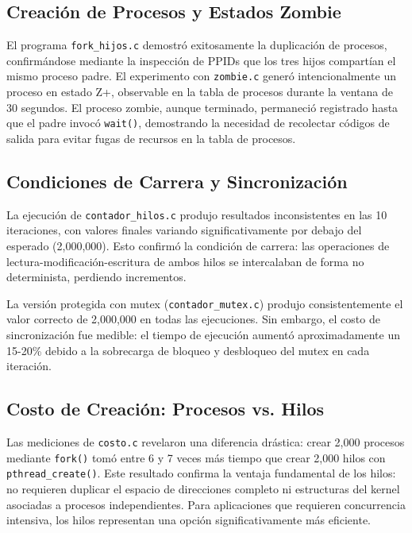 \documentclass[conference]{IEEEtran}
\begin{document}
\subsection{Creación de Procesos y Estados Zombie}

El programa \texttt{fork\_hijos.c} demostró exitosamente la duplicación de procesos, confirmándose mediante la inspección de PPIDs que los tres hijos compartían el mismo proceso padre. El experimento con \texttt{zombie.c} generó intencionalmente un proceso en estado Z+, observable en la tabla de procesos durante la ventana de 30 segundos. El proceso zombie, aunque terminado, permaneció registrado hasta que el padre invocó \texttt{wait()}, demostrando la necesidad de recolectar códigos de salida para evitar fugas de recursos en la tabla de procesos.

\subsection{Condiciones de Carrera y Sincronización}

La ejecución de \texttt{contador\_hilos.c} produjo resultados inconsistentes en las 10 iteraciones, con valores finales variando significativamente por debajo del esperado (2,000,000). Esto confirmó la condición de carrera: las operaciones de lectura-modificación-escritura de ambos hilos se intercalaban de forma no determinista, perdiendo incrementos.

La versión protegida con mutex (\texttt{contador\_mutex.c}) produjo consistentemente el valor correcto de 2,000,000 en todas las ejecuciones. Sin embargo, el costo de sincronización fue medible: el tiempo de ejecución aumentó aproximadamente un 15-20\% debido a la sobrecarga de bloqueo y desbloqueo del mutex en cada iteración.

\subsection{Costo de Creación: Procesos vs. Hilos}

Las mediciones de \texttt{costo.c} revelaron una diferencia drástica: crear 2,000 procesos mediante \texttt{fork()} tomó entre 6 y 7 veces más tiempo que crear 2,000 hilos con \texttt{pthread\_create()}. Este resultado confirma la ventaja fundamental de los hilos: no requieren duplicar el espacio de direcciones completo ni estructuras del kernel asociadas a procesos independientes. Para aplicaciones que requieren concurrencia intensiva, los hilos representan una opción significativamente más eficiente.
\end{document}

